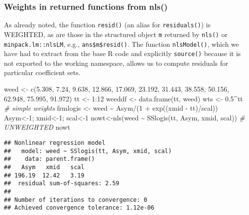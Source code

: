 \documentclass[
]{article}
\newenvironment{Shaded}{\begin{snugshade}}{\end{snugshade}}
\newcommand{\CommentTok}[1]{\textcolor[rgb]{0.56,0.35,0.01}{\textit{#1}}}
\newcommand{\DecValTok}[1]{\textcolor[rgb]{0.00,0.00,0.81}{#1}}
\newcommand{\FloatTok}[1]{\textcolor[rgb]{0.00,0.00,0.81}{#1}}
\newcommand{\FunctionTok}[1]{\textcolor[rgb]{0.00,0.00,0.00}{#1}}
\newcommand{\NormalTok}[1]{#1}
\newcommand{\OtherTok}[1]{\textcolor[rgb]{0.56,0.35,0.01}{#1}}
\newcommand{\SpecialCharTok}[1]{\textcolor[rgb]{0.00,0.00,0.00}{#1}}
\begin{document}
\hypertarget{weights-in-returned-functions-from-nls}{%
\subsubsection{Weights in returned functions from
nls()}\label{weights-in-returned-functions-from-nls}}

As already noted, the function \texttt{resid()} (an alias for
\texttt{residuals()}) is WEIGHTED, as are those in the structured object
\texttt{m} returned by \texttt{nls()} or \texttt{minpack.lm::nlsLM},
e.g., \texttt{ans\$m\$resid()}. The function \texttt{nlsModel()}, which
we have had to extract from the base R code and explicitly
\texttt{source()} because it is not exported to the working namespace,
allows us to compute residuals for particular coefficient sets.

\begin{Shaded}
\begin{Highlighting}[]
\NormalTok{weed }\OtherTok{\textless{}{-}} \FunctionTok{c}\NormalTok{(}\FloatTok{5.308}\NormalTok{, }\FloatTok{7.24}\NormalTok{, }\FloatTok{9.638}\NormalTok{, }\FloatTok{12.866}\NormalTok{, }\FloatTok{17.069}\NormalTok{, }\FloatTok{23.192}\NormalTok{, }\FloatTok{31.443}\NormalTok{,}
          \FloatTok{38.558}\NormalTok{, }\FloatTok{50.156}\NormalTok{, }\FloatTok{62.948}\NormalTok{, }\FloatTok{75.995}\NormalTok{, }\FloatTok{91.972}\NormalTok{)}
\NormalTok{tt }\OtherTok{\textless{}{-}} \DecValTok{1}\SpecialCharTok{:}\DecValTok{12}
\NormalTok{weeddf }\OtherTok{\textless{}{-}} \FunctionTok{data.frame}\NormalTok{(tt, weed)}
\NormalTok{wts }\OtherTok{\textless{}{-}} \FloatTok{0.5}\SpecialCharTok{\^{}}\NormalTok{tt }\CommentTok{\# simple weights}
\NormalTok{frmlogis }\OtherTok{\textless{}{-}}\NormalTok{ weed }\SpecialCharTok{\textasciitilde{}}\NormalTok{ Asym}\SpecialCharTok{/}\NormalTok{(}\DecValTok{1} \SpecialCharTok{+} \FunctionTok{exp}\NormalTok{((xmid }\SpecialCharTok{{-}}\NormalTok{ tt)}\SpecialCharTok{/}\NormalTok{scal))}
\NormalTok{Asym}\OtherTok{\textless{}{-}}\DecValTok{1}\NormalTok{; xmid}\OtherTok{\textless{}{-}}\DecValTok{1}\NormalTok{; scal}\OtherTok{\textless{}{-}}\DecValTok{1}
\NormalTok{nowt}\OtherTok{\textless{}{-}}\FunctionTok{nls}\NormalTok{(weed }\SpecialCharTok{\textasciitilde{}} \FunctionTok{SSlogis}\NormalTok{(tt, Asym, xmid, scal)) }\CommentTok{\# UNWEIGHTED}
\NormalTok{nowt}
\end{Highlighting}
\end{Shaded}

\begin{verbatim}
## Nonlinear regression model
##   model: weed ~ SSlogis(tt, Asym, xmid, scal)
##    data: parent.frame()
##   Asym   xmid   scal 
## 196.19  12.42   3.19 
##  residual sum-of-squares: 2.59
## 
## Number of iterations to convergence: 0 
## Achieved convergence tolerance: 1.12e-06
\end{verbatim}
\end{document}
